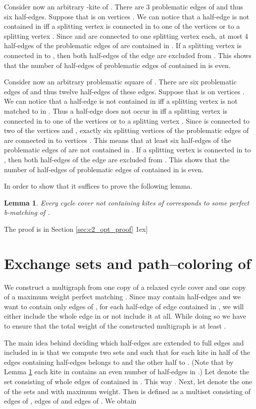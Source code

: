 \documentclass[a4, 11pt]{article}
\newcommand{\koniec}{\hfill \.1ex]}
\newcommand{\<}{\langle}
\renewcommand{\>}{\rangle}
\newtheorem{lemma}{Lemma}
\begin{document}
Consider now an arbitrary -kite  of . There are 3 problematic edges of  and thus six half-edges. Suppose that  is on vertices . We can notice that a half-edge   is not contained in  
iff a splitting vertex  is connected in  to one of the vertices  or to a splitting vertex . Since  and  are connected to one splitting vertex each, at most 4 half-edges of the problematic edges of  are contained in . If
 a splitting vertex  is connected in  to  , then both half-edges of the edge  are excluded from .
This shows that the number of half-edges of problematic edges of  contained in  is even.

Consider now an arbitrary problematic square  of . There are six problematic edges of  and thus twelve half-edges of these edges. Suppose that  is on vertices . We can notice that a half-edge   is not contained in  
iff a splitting vertex  is not matched to  in . Thus a half-edge  does not occur in  iff 
 a splitting vertex  is connected in  to one of the vertices  or to a splitting vertex .
Since  is connected to two of the vertices  and , exactly six splitting vertices of the problematic edges of  are connected in  to vertices . This means  that at least six half-edges of the problematic edges of  are not contained in .  If
 a splitting vertex  is connected in  to  , then both half-edges of the edge  are excluded from .
This shows that the number of half-edges of problematic edges of  contained in  is even.

In order to show that  it suffices to prove the following lemma.
\begin{lemma}
\label{lem:cycle_cover_optimality}
Every cycle cover not containing kites of  corresponds to some  perfect b-matching of .
\end{lemma} 
The proof is in Section \ref{sec:c2_opt_proof} \koniec


\section{Exchange sets  and path--coloring of }

We construct a multigraph  from one copy of  a relaxed cycle cover  and one copy of a maximum weight perfect matching .
Since  may contain half-edges and we want  to  contain only edges of , for each half-edge of edge  contained in , we will either include the whole edge  in  or not include it at all. While doing so we have to ensure that the total weight of the constructed multigraph  is at least . 

 The main idea behind deciding which half-edges are extended to full edges and included in  is that we compute two sets  and   such that for each kite in  half of the edges containing half-edges belongs to  and the other half to . (Note that by Lemma \ref{} each kite in  contains an even number of half-edges in .) Let  denote the set consisting of whole edges of  contained in . This way . Next, let  denote the one of the sets  and  with maximum  weight. Then  is defined as a multiset consisting of edges of , edges of  and edges of . We obtain
\end{document}
